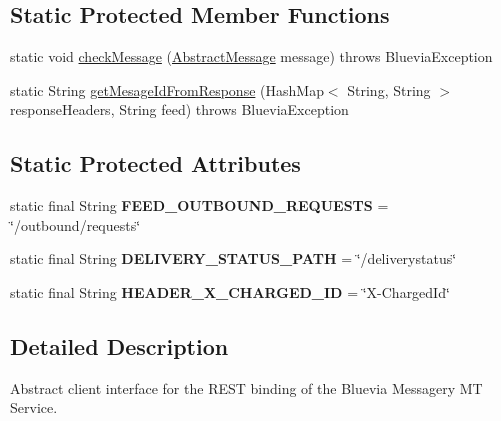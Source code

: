 \subsection*{Static Protected Member Functions}
\begin{DoxyCompactItemize}
\item 
static void \hyperlink{classcom_1_1bluevia_1_1messagery_1_1mt_1_1client_1_1BVMtClient_ad7c48e90d23d1986cb5871b0ed87d271}{checkMessage} (\hyperlink{classcom_1_1bluevia_1_1messagery_1_1data_1_1AbstractMessage}{AbstractMessage} message)  throws BlueviaException 
\item 
static String \hyperlink{classcom_1_1bluevia_1_1messagery_1_1mt_1_1client_1_1BVMtClient_a07bd79cdd74c1e15f5b19c50ff7708bb}{getMesageIdFromResponse} (HashMap$<$ String, String $>$ responseHeaders, String feed)  throws BlueviaException
\end{DoxyCompactItemize}
\subsection*{Static Protected Attributes}
\begin{DoxyCompactItemize}
\item 
\hypertarget{classcom_1_1bluevia_1_1messagery_1_1mt_1_1client_1_1BVMtClient_a0b7fed825889e62a18400ef4b76f1d5f}{
static final String {\bfseries FEED\_\-OUTBOUND\_\-REQUESTS} = \char`\"{}/outbound/requests\char`\"{}}
\label{classcom_1_1bluevia_1_1messagery_1_1mt_1_1client_1_1BVMtClient_a0b7fed825889e62a18400ef4b76f1d5f}

\item 
\hypertarget{classcom_1_1bluevia_1_1messagery_1_1mt_1_1client_1_1BVMtClient_af2c806d767dbd27479ac5a72aadc8001}{
static final String {\bfseries DELIVERY\_\-STATUS\_\-PATH} = \char`\"{}/deliverystatus\char`\"{}}
\label{classcom_1_1bluevia_1_1messagery_1_1mt_1_1client_1_1BVMtClient_af2c806d767dbd27479ac5a72aadc8001}

\item 
\hypertarget{classcom_1_1bluevia_1_1messagery_1_1mt_1_1client_1_1BVMtClient_ac02050090b337bbd5de022fe13a29300}{
static final String {\bfseries HEADER\_\-X\_\-CHARGED\_\-ID} = \char`\"{}X-\/ChargedId\char`\"{}}
\label{classcom_1_1bluevia_1_1messagery_1_1mt_1_1client_1_1BVMtClient_ac02050090b337bbd5de022fe13a29300}

\end{DoxyCompactItemize}


\subsection{Detailed Description}
Abstract client interface for the REST binding of the Bluevia Messagery MT Service.

